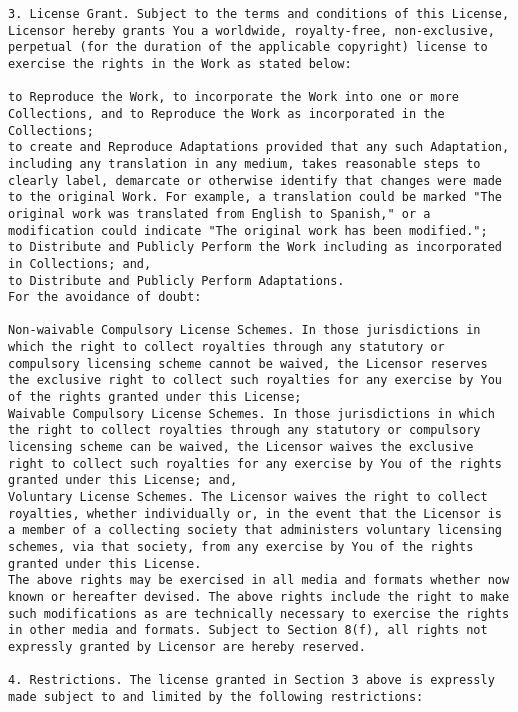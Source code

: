 \documentclass[10pt,A4]{book}
\begin{document}
\begin{verbatim}
3. License Grant. Subject to the terms and conditions of this License, Licensor hereby grants You a worldwide, royalty-free, non-exclusive, perpetual (for the duration of the applicable copyright) license to exercise the rights in the Work as stated below:

to Reproduce the Work, to incorporate the Work into one or more Collections, and to Reproduce the Work as incorporated in the Collections;
to create and Reproduce Adaptations provided that any such Adaptation, including any translation in any medium, takes reasonable steps to clearly label, demarcate or otherwise identify that changes were made to the original Work. For example, a translation could be marked "The original work was translated from English to Spanish," or a modification could indicate "The original work has been modified.";
to Distribute and Publicly Perform the Work including as incorporated in Collections; and,
to Distribute and Publicly Perform Adaptations.
For the avoidance of doubt:

Non-waivable Compulsory License Schemes. In those jurisdictions in which the right to collect royalties through any statutory or compulsory licensing scheme cannot be waived, the Licensor reserves the exclusive right to collect such royalties for any exercise by You of the rights granted under this License;
Waivable Compulsory License Schemes. In those jurisdictions in which the right to collect royalties through any statutory or compulsory licensing scheme can be waived, the Licensor waives the exclusive right to collect such royalties for any exercise by You of the rights granted under this License; and,
Voluntary License Schemes. The Licensor waives the right to collect royalties, whether individually or, in the event that the Licensor is a member of a collecting society that administers voluntary licensing schemes, via that society, from any exercise by You of the rights granted under this License.
The above rights may be exercised in all media and formats whether now known or hereafter devised. The above rights include the right to make such modifications as are technically necessary to exercise the rights in other media and formats. Subject to Section 8(f), all rights not expressly granted by Licensor are hereby reserved.

4. Restrictions. The license granted in Section 3 above is expressly made subject to and limited by the following restrictions:


\end{verbatim}
\end{document}
